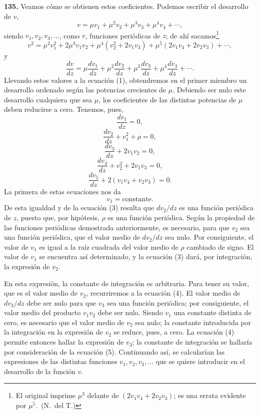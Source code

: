 \noindent\textbf{135.} Veamos cómo se obtienen estos coeficientes. Podemos
escribir el desarrollo de $v$,
\[
v=\mu v_1+\mu^2v_2+\mu^3v_3+\mu^4v_4+\cdots,
\]
siendo $v_1,v_2,v_3,\ldots$, como $v$, funciones periódicas de $z$; de ahí
sacamos\footnote{El original imprime $\mu^3$ delante de
$(2v_1v_4+2v_2v_3)$; es una errata evidente por $\mu^5$.~(N.~del T.)}
\[
v^2=\mu^2v_1^2+2\mu^3v_1v_2+\mu^4(v_2^2+2v_1v_3)
+\mu^5(2v_1v_4+2v_2v_3)+\cdots,
\]
y
\[
\frac{dv}{dz}=\mu\frac{dv_1}{dz}+\mu^2\frac{dv_2}{dz}
+\mu^3\frac{dv_3}{dz}+\mu^4\frac{dv_4}{dz}+\cdots.
\]
Llevando estos valores a la ecuación (1), obtendremos en el primer
miembro un desarrollo ordenado según las potencias crecientes de $\mu$.
Debiendo ser nulo este desarrollo cualquiera que sea $\mu$, los
coeficientes de las distintas potencias de $\mu$ deben reducirse a cero.
Tenemos, pues,
\begin{equation}
\frac{dv_1}{dz}=0,
\tag{2}
\end{equation}
\begin{equation}
\frac{dv_2}{dz}+v_1^2+\rho=0,
\tag{3}
\end{equation}
\begin{equation}
\frac{dv_3}{dz}+2v_1v_2=0,
\tag{4}
\end{equation}
\begin{equation}
\frac{dv_4}{dz}+v_2^2+2v_1v_3=0,
\tag{5}
\end{equation}
\begin{equation}
\frac{dv_5}{dz}+2(v_1v_4+v_2v_3)=0.
\tag{6}
\end{equation}
La primera de estas ecuaciones nos da
\[
v_1=\text{constante}.
\]
De esta igualdad y de la ecuación (3) resulta que $dv_2/dz$ es una
función periódica de $z$, puesto que, por hipótesis, $\rho$ es una función
periódica. Según la propiedad de las funciones periódicas demostrada
anteriormente, es necesario, para que $v_2$ sea una función periódica, que
el valor medio de $dv_2/dz$ sea nulo. Por consiguiente, el valor de $v_1$
es igual a la raíz cuadrada del valor medio de $\rho$ cambiado de signo. El
valor de $v_1$ se encuentra así determinado, y la ecuación (3) dará, por
integración, la expresión de $v_2$.

En esta expresión, la constante de integración es arbitraria. Para tener
su valor, que es el valor medio de $v_2$, recurriremos a la ecuación (4).
El valor medio de $dv_3/dz$ debe ser nulo para que $v_3$ sea una función
periódica; por consiguiente, el valor medio del producto $v_1v_2$ debe ser
nulo. Siendo $v_1$ una constante distinta de cero, es necesario que el
valor medio de $v_2$ sea nulo; la constante introducida por la integración
en la expresión de $v_2$ se reduce, pues, a cero. La ecuación (4) permite
entonces hallar la expresión de $v_3$; la constante de integración se
hallaría por consideración de la ecuación (5). Continuando así, se
calcularían las expresiones de las distintas funciones
$v_1,v_2,v_3,\ldots$ que se quiere introducir en el desarrollo de la función
$v$.

